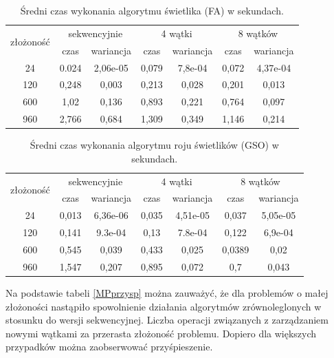 \documentclass[11pt,a4paper,twoside]{article}
\begin{document}
\bgroup
\def\arraystretch{1.1}
\begin{table}[ht]
\caption{Średni czas wykonania algorytmu świetlika (FA) w sekundach.}
\label{wspólnaFA}
\centering
\begin{tabular}{|c||c|c||c|c||c|c|}
\hline
 \multirow{2}{*}{złożoność} & \multicolumn{2}{c||}{sekwencyjnie} & \multicolumn{2}{c||}{4 wątki} & \multicolumn{2}{c|}{8 wątków} \\\cline{2-7}
 & czas & wariancja & czas & wariancja & czas & wariancja \\\hline
 24 & 0.024 & 2,06e-05 & 0,079 & 7,8e-04 & 0,072& 4,37e-04\\\hline
 120 & 0,248 & 0,003 & 0,213 & 0,028 & 0,201 & 0,013 \\\hline
 600 & 1,02 & 0,136 & 0,893 & 0,221 & 0,764 & 0,097 \\\hline
 960 & 2,766 & 0,684 & 1,309 & 0,349 & 1,146 & 0,214 \\\hline
\end{tabular}
\end{table}
\egroup

\bgroup
\def\arraystretch{1.1}
\begin{table}[ht]
\caption{Średni czas wykonania algorytmu roju świetlików (GSO) w sekundach.}
\label{wspólnaGSO}
\centering
\begin{tabular}{|c||c|c||c|c||c|c|}
\hline
 \multirow{2}{*}{złożoność} & \multicolumn{2}{c||}{sekwencyjnie} & \multicolumn{2}{c||}{4 wątki} & \multicolumn{2}{c|}{8 wątków} \\\cline{2-7}
 & czas & wariancja & czas & wariancja & czas & wariancja \\\hline
 24 & 0,013 & 6,36e-06 & 0,035 & 4,51e-05 & 0,037 & 5,05e-05\\\hline
 120 & 0,141 & 9.3e-04 & 0,13 & 7.8e-04 & 0,122 & 6,9e-04 \\\hline
 600 & 0,545 & 0,039 & 0,433 & 0,025 & 0,0389 & 0,02 \\\hline
 960 & 1,547 & 0,207 & 0,895 & 0,072 & 0,7 & 0,043 \\\hline
\end{tabular}
\end{table}
\egroup
\vspace*{1\baselineskip}

Na podstawie tabeli \ref{MPprzysp} można zauważyć, że dla problemów o małej złożoności nastąpiło spowolnienie działania algorytmów zrównoleglonych w stosunku do wersji sekwencyjnej. Liczba operacji związanych z zarządzaniem nowymi wątkami za przerasta złożoność problemu. Dopiero dla większych przypadków można zaobserwować przyśpieszenie.
\end{document}
